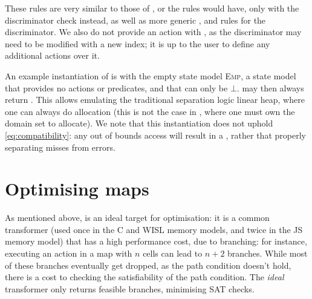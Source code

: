 
These rules are very similar to those of \PMap, or the rules \List{} would have, only with the discriminator check instead, as well as more generic \consume, \produce{} and \fix{} rules for the discriminator. We also do not provide an \alloc{} action with \GMap, as the discriminator may need to be modified with a new index; it is up to the user to define any additional actions over it.

An example instantiation of \GMap{} is with the empty state model \textsc{Emp}, a state model that provides no actions or predicates, and that can only be $\bot$.  may then always return \vtrue. This allows emulating the traditional separation logic linear heap, where one can always do allocation (this is not the case in \PMap{}, where one must own the domain set to allocate). We note that this instantiation does not uphold \ref{eq:compatibility}: any out of bounds access will result in a \Miss{}, rather that properly separating misses from errors.

\section{Optimising maps}

As mentioned above, \GMap{} is an ideal target for optimisation: it is a common transformer (used once in the C and WISL memory models, and twice in the JS memory model) that has a high performance cost, due to branching: for instance, executing an action in a map with $n$ cells can lead to $n + 2$ branches. While most of these branches eventually get dropped, as the path condition doesn't hold, there is a cost to checking the satisfiability of the path condition. The \emph{ideal} \GMap{} transformer only returns feasible branches, minimising SAT checks.

